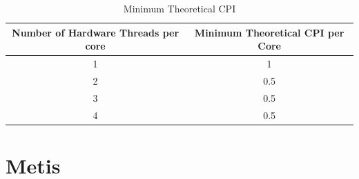 \documentclass{beamer}
\begin{document}
\begin{frame}
\begin{table}[H]
\centering
\footnotesize
\begin{tabular}{| c | c |}\hline
Number of Hardware Threads per core & Minimum Theoretical CPI per Core\\ \hline
1 & 1\\ \hline
2 & 0.5\\ \hline
3 & 0.5\\ \hline
4 & 0.5\\ \hline
\end{tabular}
\caption{Minimum Theoretical CPI}
\end{table}
\end{frame}


\section{Metis}

\begin{frame}
\end{frame}



\begin{frame}
\end{frame}



\begin{frame}
\end{frame}
\end{document}
